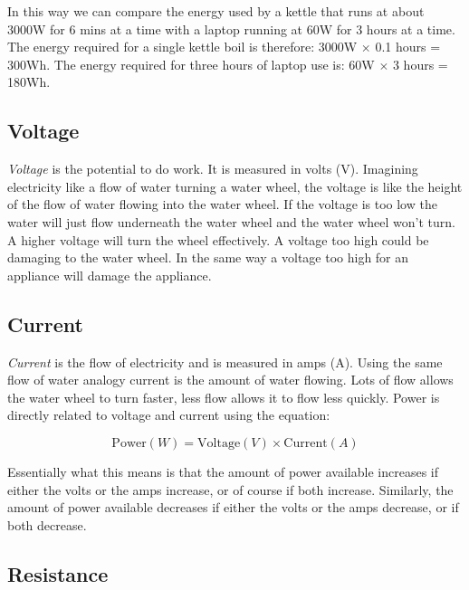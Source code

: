 \documentclass{article}
\theoremstyle{definition}
\theoremstyle{definition}
\theoremstyle{remark}
\begin{document}
    In this way we can compare the energy used by a kettle that runs at about 3000W for 6 mins at a time with a laptop running at 60W for 3 hours at a time. The energy required for a single kettle boil is therefore: 3000W $\times$ 0.1 hours = 300Wh. The energy required for three hours of laptop use is: 60W $\times$ 3 hours = 180Wh. 
  

  \subsection{Voltage} %
  \label{sub:voltage}

    \textit{Voltage} is the potential  to do work. It is measured in volts (V). Imagining electricity like a flow of water turning a water wheel, the voltage is like the height of the flow of water flowing into the water wheel. If the voltage is too low the water will just flow underneath the water wheel and the water wheel won't turn. A higher voltage will turn the wheel effectively. A voltage too high could be damaging to the water wheel. In the same way a voltage too high for an appliance will damage the appliance. 


  \subsection{Current} %
  \label{sub:current}

    \textit{Current} is the flow of electricity and is measured in amps (A). Using the same flow of water analogy current is the amount of water flowing. Lots of flow allows the water wheel to turn faster, less flow allows it to flow less quickly. Power is directly related to voltage and current using the equation:

    \begin{equation}
      \text{Power} (W) = \text{Voltage} (V) \times \text{Current} (A)
    \end{equation}
    
    Essentially what this means is that the amount of power available increases if either the volts or the amps increase, or of course if both increase. Similarly, the amount of power available decreases if either the volts or the amps decrease, or if both decrease.


  \subsection{Resistance} %
  \label{sub:resistance}
\end{document}
